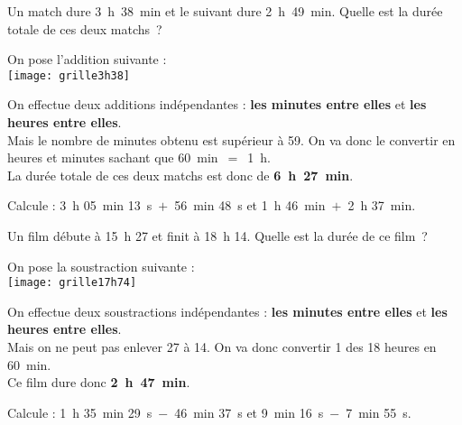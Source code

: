\begin{methode*1}

\begin{exemple*1}
Un match dure 3 h 38 min et le suivant dure 2 h 49 min. Quelle est la durée totale de ces deux matchs ? \\[1em]
\begin{minipage}[t]{.4\textwidth}
On pose l'addition suivante :\\[0.2em]

\texttt{[image: grille3h38]}
\end{minipage}\hfill%
\begin{minipage}[t]{.58\textwidth}
On effectue deux additions indépendantes : 
\textcolor{vert}{\textbf{les minutes entre elles}} et \textcolor{bleu}{\textbf{les heures entre elles}}.\\[0.75em]
Mais le nombre de minutes obtenu est supérieur à 59. 
On va donc le convertir en heures et minutes sachant que 60 min $=$ 1 h. \\[0.75em]
La durée totale de ces deux matchs est donc de \textcolor{rose}{\textbf{6 h 27 min}}.
\end{minipage}

\end{exemple*1}

\exercice

Calcule : 3 h 05 min 13 s $+$ 56 min 48 s et 1 h 46 min $+$ 2 h 37 min.

\end{methode*1}


\begin{methode*1}

\begin{exemple*1}
Un film débute à 15 h 27 et finit à 18 h 14. Quelle est la durée de ce film ? \\[1em]

\begin{minipage}[t]{.4\textwidth}
On pose la soustraction suivante :\\[0.2em]

\texttt{[image: grille17h74]}
\end{minipage}\hfill%
\begin{minipage}[t]{.58\textwidth}
On effectue deux soustractions indépendantes : 
\textcolor{vert}{\textbf{les minutes entre elles}} et \textcolor{bleu}{\textbf{les heures entre elles}}.\\[0.75em]
Mais on ne peut pas enlever 27 à 14. 
On va donc convertir 1 des 18 heures en 60 min. \\[0.75em]
Ce film dure donc \textcolor{rose}{\textbf{2 h 47 min}}.
\end{minipage}

\end{exemple*1}

\exercice

Calcule : 1 h 35 min 29 s $-$ 46 min 37 s et 9 min 16 s $-$ 7 min 55 s.


\end{methode*1}